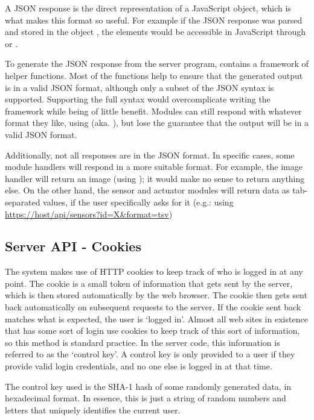 A JSON response is the direct representation of a JavaScript object, which is what makes this format so useful. For example if the JSON response was parsed and stored in the object , the elements would be accessible in JavaScript through  or .

To generate the JSON response from the server program,  contains a framework of helper functions. Most of the functions help to ensure that the generated output is in a valid JSON format, although only a subset of the JSON syntax is supported. Supporting the full syntax would overcomplicate writing the framework while being of little benefit. Modules can still respond with whatever format they like, using  (aka. ), but lose the guarantee that the output will be in a valid JSON format. 

Additionally, not all responses are in the JSON format. In specific cases, some module handlers will respond in a more suitable format. For example, the image handler will return an image (using ); it would make no sense to return anything else. On the other hand, the sensor and actuator modules will return data as tab-separated values, if the user specifically asks for it (e.g.: using \url{https://host/api/sensors?id=X&format=tsv})

\subsection{Server API - Cookies}\label{Cookies}

The system makes use of HTTP cookies to keep track of who is logged in at any point. The cookie is a small token of information that gets sent by the server, which is then stored automatically by the web browser. The cookie then gets sent back automatically on subsequent requests to the server. If the cookie sent back matches what is expected, the user is `logged in'. Almost all web sites in existence that has some sort of login use cookies to keep track of this sort of information, so this method is standard practice. 
In the server code, this information is referred to as the `control key'. A control key is only provided to a user if they provide valid login credentials, and no one else is logged in at that time. 

The control key used is the SHA-1 hash of some randomly generated data, in hexadecimal format. In essence, this is just a string of random numbers and letters that uniquely identifies the current user.

